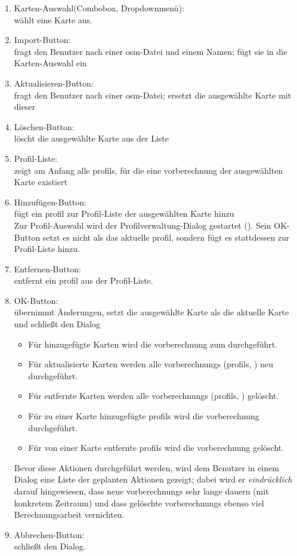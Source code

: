 \documentclass[a4paper, 11pt]{article}
\begin{document}
\begin{enumerate}
\item Karten-Auswahl(Combobox, Dropdownmenü):\\
wählt eine Karte aus.
\item Import-Button:\\
fragt den Benutzer nach einer \gls{osm}-Datei und einem Namen; fügt sie in die Karten-Auswahl ein
\item Aktualisieren-Button:\\
fragt den Benutzer nach einer \gls{osm}-Datei; ersetzt die ausgewählte Karte mit dieser
\item Löschen-Button:\\
löscht die ausgewählte Karte aus der Liste
\item Profil-Liste:\\
zeigt am Anfang alle \glspl{profil}, für die eine \gls{vorberechnung} der ausgewählten Karte existiert
\item Hinzufügen-Button:\\
fügt ein \gls{profil} zur Profil-Liste der ausgewählten Karte hinzu\\
Zur Profil-Auswahl wird der Profilverwaltung-Dialog gestartet (). Sein OK-Button setzt es nicht als das aktuelle \gls{profil}, sondern fügt es stattdessen zur Profil-Liste hinzu.
\item Entfernen-Button:\\
entfernt ein \gls{profil} aus der Profil-Liste.
\item OK-Button:\\
übernimmt Änderungen, setzt die ausgewählte Karte als die aktuelle Karte und schließt den Dialog
  \begin{itemize}
  \item Für hinzugefügte Karten wird die \gls{vorberechnung} zum  durchgeführt.
  \item Für aktualisierte Karten werden alle \glspl{vorberechnung} (\glspl{profil}, ) neu durchgeführt.
  \item Für entfernte Karten werden alle \glspl{vorberechnung} (\glspl{profil}, ) gelöscht.
  \item Für zu einer Karte hinzugefügte \glspl{profil} wird die \gls{vorberechnung}  durchgeführt.
  \item Für von einer Karte entfernte \glspl{profil} wird die \gls{vorberechnung} gelöscht.
  \end{itemize}
  Bevor diese Aktionen durchgeführt werden, wird dem Benutzer in einem Dialog eine Liste der geplanten Aktionen gezeigt; dabei wird er \emph{eindrücklich} darauf hingewiesen, dass neue \glspl{vorberechnung} sehr lange dauern (mit konkretem Zeitraum) und dass gelöschte \glspl{vorberechnung} ebenso viel Berechnungsarbeit vernichten.
\item Abbrechen-Button:\\
schließt den Dialog.\\
\end{enumerate}
\end{document}
